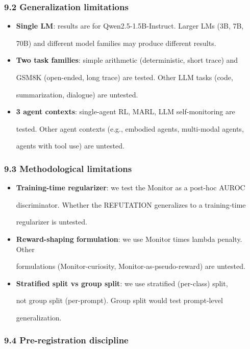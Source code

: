 \documentclass[11pt]{article}
\begin{document}
\subsubsection{9.2 Generalization
limitations}\label{generalization-limitations}

\begin{itemize}
\item
  \textbf{Single LM}: results are for Qwen2.5-1.5B-Instruct. Larger LMs
  (3B, 7B,

  70B) and different model families may produce different results.
\item
  \textbf{Two task families}: simple arithmetic (deterministic, short
  trace) and

  GSM8K (open-ended, long trace) are tested. Other LLM tasks (code,

  summarization, dialogue) are untested.
\item
  \textbf{3 agent contexts}: single-agent RL, MARL, LLM self-monitoring
  are

  tested. Other agent contexts (e.g., embodied agents, multi-modal
  agents,

  agents with tool use) are untested.
\end{itemize}

\subsubsection{9.3 Methodological
limitations}\label{methodological-limitations}

\begin{itemize}
\item
  \textbf{Training-time regularizer}: we test the Monitor as a post-hoc
  AUROC

  discriminator. Whether the REFUTATION generalizes to a training-time

  regularizer is untested.
\item
  \textbf{Reward-shaping formulation}: we use Monitor times lambda
  penalty. Other

  formulations (Monitor-curiosity, Monitor-as-pseudo-reward) are
  untested.
\item
  \textbf{Stratified split vs group split}: we use stratified
  (per-class) split,

  not group split (per-prompt). Group split would test prompt-level

  generalization.
\end{itemize}

\subsubsection{9.4 Pre-registration
discipline}\label{pre-registration-discipline}
\end{document}
